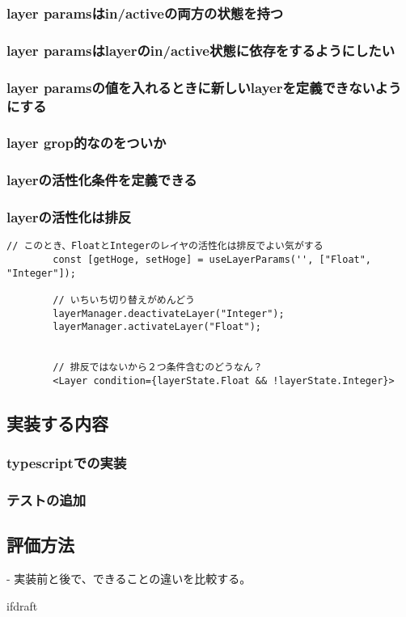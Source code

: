 \documentclass{jsarticle}
\begin{document}
    \subsubsection{layer paramsはin/activeの両方の状態を持つ}

    \subsubsection{layer paramsはlayerのin/active状態に依存をするようにしたい}

    \subsubsection{layer paramsの値を入れるときに新しいlayerを定義できないようにする}

    \subsubsection{layer grop的なのをついか}

    \subsubsection{layerの活性化条件を定義できる}

    \subsubsection{layerの活性化は排反}
        \begin{lstlisting}[caption=hoge,label=fuga]
        // このとき、FloatとIntegerのレイヤの活性化は排反でよい気がする
        const [getHoge, setHoge] = useLayerParams('', ["Float", "Integer"]);

        // いちいち切り替えがめんどう
        layerManager.deactivateLayer("Integer");
        layerManager.activateLayer("Float");


        // 排反ではないから２つ条件含むのどうなん？
        <Layer condition={layerState.Float && !layerState.Integer}>
        \end{lstlisting}

    \subsection{実装する内容}

    \subsubsection{typescriptでの実装}

    \subsubsection{テストの追加}


    \subsection{評価方法}
    - 実装前と後で、できることの違いを比較する。
















    \expandafter\ifx\csname ifdraft\endcsname\relax
\end{document}
